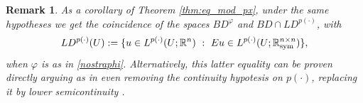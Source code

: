 \documentclass[a4paper,11pt,oneside,notitlepage]{article}
\newtheorem{remark}[theorem]{Remark}
\numberwithin{equation}{section}
\def\R{\mathbb{R}}
\def\sym{{\rm sym}}
\newcommand{\vphi}{\varphi}
\newcommand{\st}{ \ : \ }
\begin{document}
    
    


\begin{remark}
   As a corollary of Theorem \ref{thm:eq_mod_px}, under the same hypotheses we get the coincidence of the spaces $BD^\vphi$ and $BD \cap LD^{p(\cdot)}$, with
   \begin{equation*}
        LD^{p(\cdot)}(U) := \{u \in L^{p(\cdot)}(U; \R^n) \st Eu \in L^{p(\cdot)}(U;\R^{n \times n}_\sym)\},
    \end{equation*}
    when $\vphi$ is as in \eqref{nostraphi}. Alternatively, this latter equality can be proven directly arguing as in \cite[Theorem 3.8]{BHHZ}  even removing the continuity hypotesis on $p(\cdot)$, replacing it by lower semicontinuity \color{black}.
\end{remark}
\end{document}
